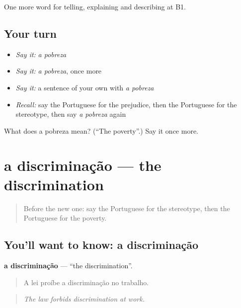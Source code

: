 \begin{grammarlens}[title={What you've built}]
One more word for telling, explaining and describing at B1.
\end{grammarlens}

\subsection*{Your turn}
\begin{itemize}
\raggedright
  \item \emph{Say it:} \emph{a pobreza}
  \item \emph{Say it:} \emph{a pobreza}, once more
  \item \emph{Say it:} a sentence of your own with \emph{a pobreza}
  \item \emph{Recall:} say the Portuguese for the prejudice, then the Portuguese for the stereotype, then say \emph{a pobreza} again
\end{itemize}

\begin{tcolorbox}[breakable,colback=teal!4,colframe=teal!35!black,title={Before you move on}]
What does a pobreza mean? (\textquotedblleft{}The poverty\textquotedblright{}.) Say it once more.
\end{tcolorbox}
\section[a discriminação]{a discriminação — the discrimination}

\label{lesson:PT-C366-discriminacao}



\begin{quote}
Before the new one: say the Portuguese for the stereotype, then the Portuguese for the poverty.
\end{quote}

\subsection*{You'll want to know: a discriminação}
\textbf{a discriminação} — \textquotedblleft{}the discrimination\textquotedblright{}.

\begin{quote}
A lei proíbe a discriminação no trabalho.
\end{quote}

\begin{quote}
\emph{The law forbids discrimination at work.}
\end{quote}

